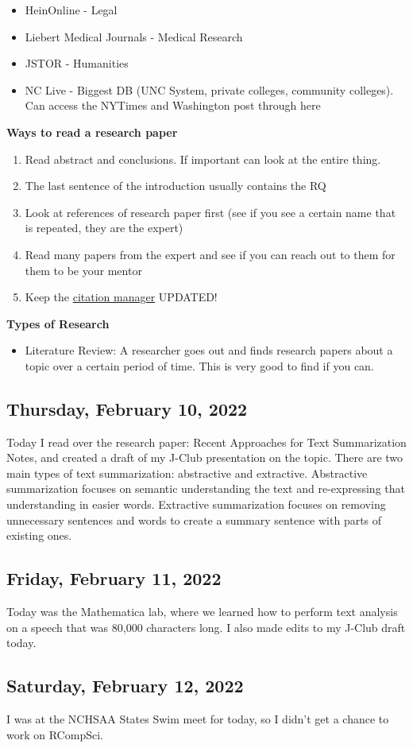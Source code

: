 \documentclass[11pt,letterpaper]{article}
\begin{document}
\begin{itemize}
    \item HeinOnline - Legal
    \item Liebert Medical Journals - Medical Research
    \item JSTOR - Humanities
    \item NC Live - Biggest DB (UNC System, private colleges, community colleges). Can access the NYTimes and Washington post through here
\end{itemize}

\textbf{Ways to read a research paper}
\begin{enumerate}
    \item Read abstract and conclusions. If important can look at the entire thing. 
    \item The last sentence of the introduction usually contains the RQ
    \item Look at references of research paper first (see if you see a certain name that is repeated, they are the expert)
    \item Read many papers from the expert and see if you can reach out to them for them to be your mentor
    \item Keep the \href{https://www.mendeley.com/reference-manager/}{citation manager} UPDATED!
\end{enumerate}

\textbf{Types of Research}
\begin{itemize}
    \item Literature Review: A researcher goes out and finds research papers about a topic over a certain period of time. This is very good to find if you can. 
\end{itemize}


\subsection{Thursday, February 10, 2022}
Today I read over the research paper: Recent Approaches for Text Summarization Notes, and created a draft of my J-Club presentation on the topic. There are two main types of text summarization: abstractive and extractive. Abstractive summarization focuses on semantic understanding the text and re-expressing that understanding in easier words. Extractive summarization focuses on removing unnecessary sentences and words to create a summary sentence with parts of existing ones.

\subsection{Friday, February 11, 2022}
Today was the Mathematica lab, where we learned how to perform text analysis on a speech that was 80,000 characters long. I also made edits to my J-Club draft today.

\subsection{Saturday, February 12, 2022}
I was at the NCHSAA States Swim meet for today, so I didn't get a chance to work on RCompSci.

\newpage
\end{document}
